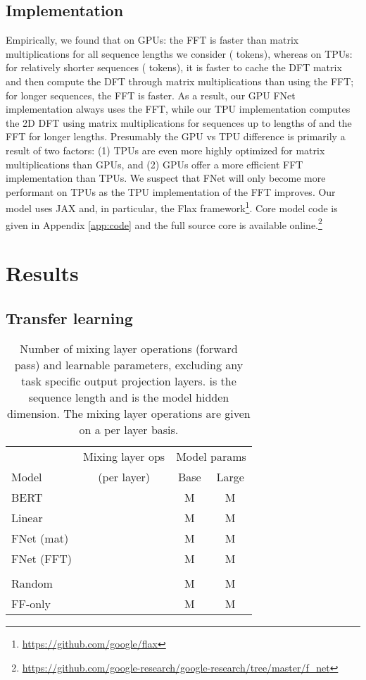 \documentclass[11pt]{article}
\begin{document}
\subsection{Implementation}
\label{subsec:implementation}

Empirically, we found that on GPUs: the FFT is faster than matrix multiplications for all sequence lengths we consider ( tokens), whereas on TPUs: for relatively shorter sequences ( tokens), it is faster to cache the DFT matrix and then compute the DFT through matrix multiplications than using the FFT; for longer sequences, the FFT is faster. As a result, our GPU FNet implementation always uses the FFT, while our TPU implementation computes the 2D DFT using matrix multiplications for sequences up to lengths of  and the FFT for longer lengths.
Presumably the GPU vs TPU difference is primarily a result of two factors: (1) TPUs are even more highly optimized for matrix multiplications than GPUs, and (2) GPUs offer a more efficient FFT implementation than TPUs. We suspect that FNet will only become more performant on TPUs as the TPU implementation of the FFT improves. Our model uses JAX and, in particular, the Flax framework\footnote{\url{https://github.com/google/flax}}. Core model code is given in Appendix \ref{app:code} and the full source core is available online.\footnote{\url{https://github.com/google-research/google-research/tree/master/f_net}} \section{Results}
\label{sec:results}


\subsection{Transfer learning}
\label{subsec:transfer_learning}

\begin{table}
    \caption{Number of mixing layer operations (forward pass) and learnable parameters, excluding any task specific output projection layers.  is the sequence length and  is the model hidden dimension. The mixing layer operations are given on a per layer basis.}
    \label{tab:model_params}
    \centering
    \setlength{\tabcolsep}{3pt}
    \begin{tabular}{l | c | c  c}
        \hline
         & Mixing layer ops & \multicolumn{2}{c}{Model params} \\ 
         Model & (per layer) & Base & Large \\  \hline \hline
         BERT &  & M & M \\
         Linear &  & M & M \\
         FNet (mat) &  & M & M \\
         FNet (FFT) &  & M & M \\
         &  & \\
         Random &  & M & M \\
         FF-only &  & M & M \\ \hline
    \end{tabular} 
\end{table}
\end{document}
